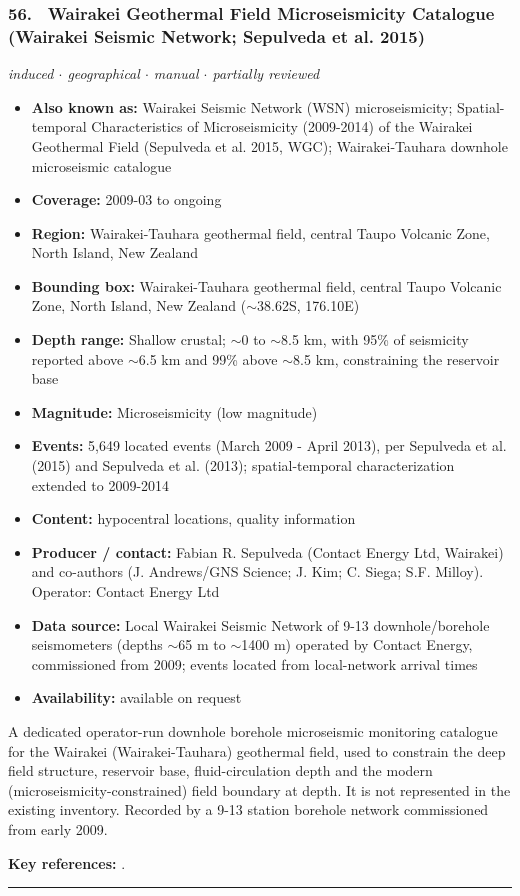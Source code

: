 \documentclass[10pt,a4paper]{article}
\newcommand{\catentryrule}{\par\vspace{3pt}\noindent\textcolor{rulegrey}{\rule{\linewidth}{0.3pt}}\par\vspace{5pt}}
\newcommand{\kv}[2]{\item \textbf{#1:} #2}
\begin{document}
\subsubsection*{\hypertarget{c:56}{56.}~ Wairakei Geothermal Field Microseismicity Catalogue (Wairakei Seismic Network; Sepulveda et al. 2015)}
{\small\itshape induced $\cdot$ geographical $\cdot$ manual $\cdot$ partially reviewed}\par\vspace{2pt}
\begin{itemize}[leftmargin=1.3em,itemsep=0.6pt,topsep=1pt,parsep=0pt]
\kv{Also known as}{Wairakei Seismic Network (WSN) microseismicity; Spatial-temporal Characteristics of Microseismicity (2009-2014) of the Wairakei Geothermal Field (Sepulveda et al. 2015, WGC); Wairakei-Tauhara downhole microseismic catalogue}
\kv{Coverage}{2009-03 to ongoing}
\kv{Region}{Wairakei-Tauhara geothermal field, central Taupo Volcanic Zone, North Island, New Zealand}
\kv{Bounding box}{Wairakei-Tauhara geothermal field, central Taupo Volcanic Zone, North Island, New Zealand ($\sim$38.62S, 176.10E)}
\kv{Depth range}{Shallow crustal; $\sim$0 to $\sim$8.5 km, with 95\% of seismicity reported above $\sim$6.5 km and 99\% above $\sim$8.5 km, constraining the reservoir base}
\kv{Magnitude}{Microseismicity (low magnitude)}
\kv{Events}{5,649 located events (March 2009 - April 2013), per Sepulveda et al. (2015) and Sepulveda et al. (2013); spatial-temporal characterization extended to 2009-2014}
\kv{Content}{hypocentral locations, quality information}
\kv{Producer / contact}{Fabian R. Sepulveda (Contact Energy Ltd, Wairakei) and co-authors (J. Andrews/GNS Science; J. Kim; C. Siega; S.F. Milloy). Operator: Contact Energy Ltd}
\kv{Data source}{Local Wairakei Seismic Network of 9-13 downhole/borehole seismometers (depths $\sim$65 m to $\sim$1400 m) operated by Contact Energy, commissioned from 2009; events located from local-network arrival times}
\kv{Availability}{available on request}
\end{itemize}
\par\vspace{2pt}A dedicated operator-run downhole borehole microseismic monitoring catalogue for the Wairakei (Wairakei-Tauhara) geothermal field, used to constrain the deep field structure, reservoir base, fluid-circulation depth and the modern (microseismicity-constrained) field boundary at depth. It is not represented in the existing inventory. Recorded by a 9-13 station borehole network commissioned from early 2009.
\par\vspace{2pt}\textbf{Key references:} \cite{Sepulveda2015,Sepulveda2013}.
\catentryrule
\end{document}
